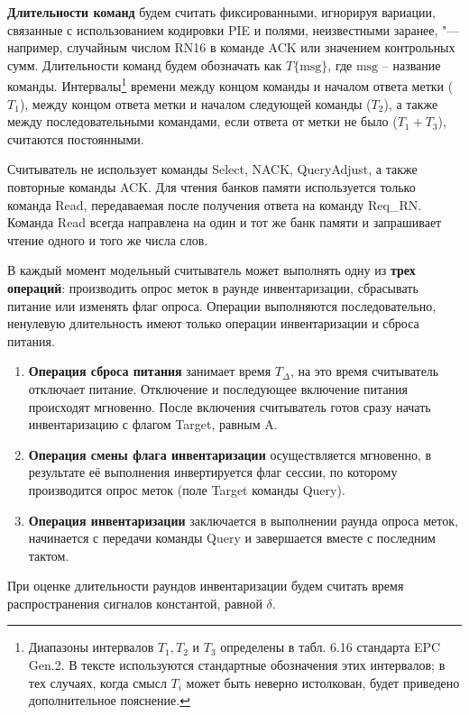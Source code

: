 \textbf{Длительности команд} будем считать фиксированными, игнорируя вариации, связанные с использованием кодировки PIE и полями, неизвестными заранее, "--- например, случайным числом RN16 в команде ACK или значением контрольных сумм. Длительности команд будем обозначать как $T\{\text{msg}\}$, где $\text{msg}$ -- название команды. Интервалы\footnote{Диапазоны интервалов $T_1, T_2 \text{ и } T_3$ определены в табл. 6.16 стандарта EPC Gen.2. В тексте используются стандартные обозначения этих интервалов; в тех случаях, когда смысл $T_i$ может быть неверно истолкован, будет приведено дополнительное пояснение.} времени между концом команды и началом ответа метки ($T_1$), между концом ответа метки и началом следующей команды ($T_2$), а также между последовательными командами, если ответа от метки не было ($T_1 + T_3$), считаются постоянными.

Считыватель не использует команды Select, NACK, QueryAdjust, а также повторные команды ACK. Для чтения банков памяти используется только команда Read, передаваемая после получения ответа на команду Req\_RN. Команда Read всегда направлена на один и тот же банк памяти и запрашивает чтение одного и того же числа слов.

В каждый момент модельный считыватель может выполнять одну из \textbf{трех операций}: производить опрос меток в раунде инвентаризации, сбрасывать питание или изменять флаг опроса. Операции выполняются последовательно, ненулевую длительность имеют только операции инвентаризации и сброса питания.

\begin{enumerate}
	\item \textbf{Операция сброса питания} занимает время $T_\Delta$, на это время считыватель отключает питание. Отключение и последующее включение питания происходят мгновенно. После включения считыватель готов сразу начать инвентаризацию с флагом Target, равным A.

	\item \textbf{Операция смены флага инвентаризации} осуществляется мгновенно, в результате её выполнения инвертируется флаг сессии, по которому производится опрос меток (поле Target команды Query).

	\item \textbf{Операция инвентаризации} заключается в выполнении раунда опроса меток, начинается с передачи команды Query и завершается вместе с последним тактом.
\end{enumerate}

При оценке длительности раундов инвентаризации будем считать время распространения сигналов константой, равной $\delta$.


